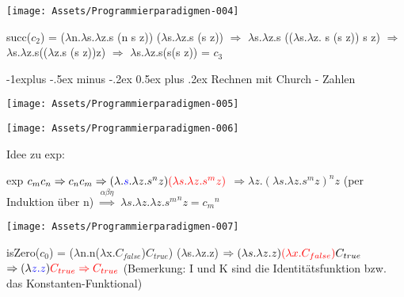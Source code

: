 \documentclass[10pt]{article}
\makeatletter
\renewcommand{\subsection}{\@startsection{subsection}{2}{0mm}%
                                {-1explus -.5ex minus -.2ex}%
                                {0.5ex plus .2ex}%
                                {\normalfont\normalsize\bfseries}}
\makeatother
\begin{document}
\begin{center}
  \texttt{[image: Assets/Programmierparadigmen-004]}
\end{center}

succ($c_2$) = ($\lambda$\color{blue}n\color{black}.$\lambda$s.$\lambda$z.s (\color{blue}n\color{black} s z)) \color{red} ($\lambda$s.$\lambda$z.s (s z)) \color{black}
\subitem $\Rightarrow$ $\lambda$s.$\lambda$z.s (($\lambda$\color{blue}s\color{black}.$\lambda$z. \color{blue} s \color{black}(\color{blue}s\color{black} z)) s z)
\subitem $\Rightarrow$ $\lambda$s.$\lambda$z.s(($\lambda$\color{blue}z\color{black}.s (s \color{blue}z\color{black}))\color{red}z\color{black})
\subitem $\Rightarrow$ $\lambda$s.$\lambda$z.s(s(s z)) = $c_3$

\subsection{Rechnen mit Church - Zahlen }

\begin{center}
  \texttt{[image: Assets/Programmierparadigmen-005]}
\end{center}

\begin{center}
  \texttt{[image: Assets/Programmierparadigmen-006]}
\end{center}

Idee zu exp: 

\subitem exp $c_m c_n \Rightarrow c_n c_m \Rightarrow (\lambda.\color{blue}s\color{black}.\lambda z.s^n z)\color{red}(\lambda s. \lambda z.s^m z)$ \color{black}
\subsubitem $\Rightarrow \lambda z.(\lambda s. \lambda z.s^m z)^n z$
\subitem (per Induktion über n) $\stackrel{\alpha \beta \eta}{\Rightarrow}$ $\lambda s.\lambda z. \lambda z.{s^m}^n z = {c_m}^n$

\begin{center}
  \texttt{[image: Assets/Programmierparadigmen-007]}
\end{center}

\subitem isZero($c_0$) = ($\lambda$\color{blue}n\color{black}.\color{blue}n\color{black}($\lambda$x.$C_{false}$)$C_{true}$)\color{red} ($\lambda$s.$\lambda$z.z)\color{black}
\subsubitem $\Rightarrow (\lambda s. \lambda z. z)\color{red} (\lambda x.C_{false})\color{black} C_{true}$
\subsubitem $\Rightarrow (\lambda \color{blue} z.z \color{black}) \color{red} C_{true} \Rightarrow C_{true}$
(Bemerkung: I und K sind die Identitätsfunktion bzw. das Konstanten-Funktional)
\end{document}
